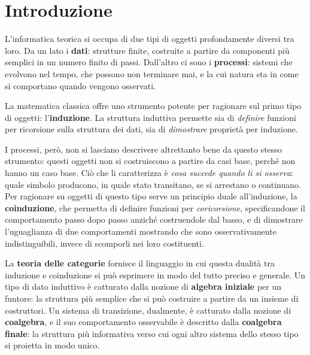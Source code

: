 \chapter{Introduzione}

L'informatica teorica si occupa di due tipi di oggetti profondamente diversi tra loro. Da un lato i \textbf{dati}: strutture finite, costruite a partire da componenti più semplici in un numero finito di passi. Dall'altro ci sono i \textbf{processi}: sistemi che evolvono nel tempo, che possono non terminare mai, e la cui natura sta in come si comportano quando vengono osservati.

La matematica classica offre uno strumento potente per ragionare sul primo tipo di oggetti: l'\textbf{induzione}. La struttura induttiva permette sia di \emph{definire} funzioni per ricorsione sulla struttura dei dati, sia di \emph{dimostrare} proprietà per induzione.

I processi, però, non si lasciano descrivere altrettanto bene da questo stesso strumento: questi oggetti non si costruiscono a partire da casi base, perché non hanno un caso base. Ciò che li caratterizza è \emph{cosa succede quando li si osserva}: quale simbolo producono, in quale stato transitano, se si arrestano o continuano. Per ragionare su oggetti di questo tipo serve un principio duale all'induzione, la \textbf{coinduzione}, che permetta di definire funzioni per \emph{coricorsione}, specificandone il comportamento passo dopo passo anziché costruendole dal basso, e di dimostrare l'uguaglianza di due comportamenti mostrando che sono osservativamente indistinguibili, invece di scomporli nei loro costituenti.

La \textbf{teoria delle categorie} fornisce il linguaggio in cui questa dualità tra induzione e coinduzione si può esprimere in modo del tutto preciso e generale. Un tipo di dato induttivo è catturato dalla nozione di \textbf{algebra iniziale} per un funtore: la struttura più semplice che si può costruire a partire da un insieme di costruttori. Un sistema di transizione, dualmente, è catturato dalla nozione di \textbf{coalgebra}, e il suo comportamento osservabile è descritto dalla \textbf{coalgebra finale}: la struttura più informativa verso cui ogni altro sistema dello stesso tipo si proietta in modo unico.

